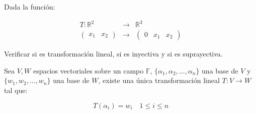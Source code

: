 		\begin{ejercicio}
			Dada la función:

			\begin{eqnarray*}
				T \colon \mathbb{R}^2 & \to & \mathbb{R}^3 \\
				\begin{pmatrix} x_1 & x_2 \end{pmatrix} & \to & \begin{pmatrix} 0 & x_1 & x_2 \end{pmatrix}
			\end{eqnarray*}

			Verificar si es transformación lineal, si es inyectiva y si es suprayectiva.
		\end{ejercicio}

		\begin{teorema}
			Sea $V, W$ espacios vectoriales sobre un campo $\mathbb{F}$, $\{\alpha_1, \alpha_2, \dots, \alpha_n\}$ una base de $V$ y $\{w_1, w_2, \dots, w_n\}$ una base de $W$, existe una única transformación lineal $T \colon V \to W$ tal que:

			\begin{equation}
				T(\alpha_i) = w_i \quad 1 \leq i \leq n
			\end{equation}
		\end{teorema}

